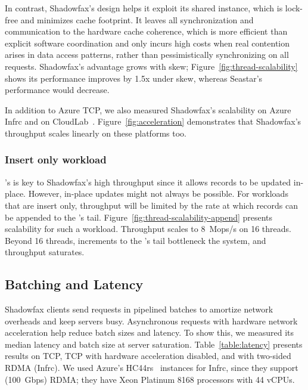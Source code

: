 In contrast, Shadowfax's design helps it exploit its shared \faster instance,
which is lock-free and minimizes cache footprint.
%
It leaves all synchronization and communication to the hardware
cache coherence, which is more efficient than explicit software
coordination and only incurs high costs when real contention arises in data
access patterns, rather than pessimistically synchronizing on all requests.
%
Shadowfax's advantage grows with skew;
Figure~\ref{fig:thread-scalability} shows its performance improves by 1.5x
under skew, whereas Seastar's performance would decrease.
%
%

In addition to Azure TCP, we also measured Shadowfax's scalability on
Azure Infrc and on CloudLab~\cite{cloudlab}.
%
Figure~\ref{fig:acceleration} demonstrates that Shadowfax's throughput
scales linearly on these platforms too.

\subsubsection{Insert only workload}
\label{sec:eval:append-only}

\faster's \hlog is key to Shadowfax's high throughput since it allows
records to be updated in-place.
%
However, in-place updates might not always be possible.
%
For workloads that are insert only, throughput will be limited by the
rate at which records can be appended to the \hlog's tail.
%
Figure~\ref{fig:thread-scalability-append} presents scalability for
such a workload.
%
Throughput scales to 8~Mops/s on 16 threads.
%
Beyond 16 threads, increments to the \hlog's tail bottleneck the system,
and throughput saturates.

\subsection{Batching and Latency}
\label{sec:eval:latency}

Shadowfax clients send requests in pipelined batches to amortize
network overheads and keep servers busy.
%
Asynchronous requests with hardware network acceleration
help reduce batch sizes and latency.
%
To show this, we measured its median latency and batch size at
server saturation.
%
%
Table~\ref{table:latency} presents results on TCP, TCP with
hardware acceleration disabled, and with two-sided RDMA (Infrc).
%
We used Azure's HC44rs~\cite{hc44} instances for Infrc, since they support
(100~Gbps) RDMA; they have Xeon Platinum 8168 processors with 44 vCPUs.
%
%
%

